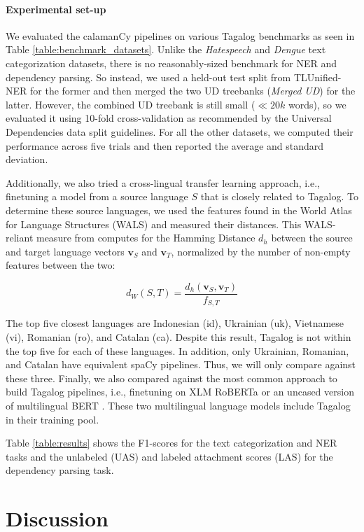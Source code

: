 \documentclass[11pt]{article}
\begin{document}
\paragraph*{Experimental set-up} 
We evaluated the calamanCy pipelines on various Tagalog benchmarks as seen in Table \ref{table:benchmark_datasets}.
Unlike the \textit{Hatespeech} and \textit{Dengue} text categorization datasets, there is no reasonably-sized benchmark for NER and dependency parsing.
So instead, we used a held-out test split from TLUnified-NER for the former and then merged the two UD treebanks (\textit{Merged UD}) for the latter. 
However, the combined UD treebank is still small ($\ll 20k$ words), so we evaluated it using 10-fold cross-validation as recommended by the Universal Dependencies data split guidelines.
For all the other datasets, we computed their performance across five trials and then reported the average and standard deviation.

Additionally, we also tried a cross-lingual transfer learning approach, i.e., finetuning a model from a source language $S$ that is closely related to Tagalog.
To determine these source languages, we used the features found in the World Atlas for Language Structures (WALS) \citep{Haspelmath2005WALS} and measured their distances.
This WALS-reliant measure from \citet{Agic2017CrossLingualPS} computes for the Hamming Distance $d_h$ between the source and target language vectors $\mathbf{v}_S$ and $\mathbf{v}_T$, normalized by the number of non-empty features between the two:

$$
d_W(S,T) = \dfrac{d_h(\mathbf{v}_S,\mathbf{v}_T)}{f_{S,T}}
$$

The top five closest languages are Indonesian (id), Ukrainian (uk), Vietnamese (vi), Romanian (ro), and Catalan (ca).
Despite this result, Tagalog is not within the top five for each of these languages.
In addition, only Ukrainian, Romanian, and Catalan have equivalent spaCy pipelines.
Thus, we will only compare against these three.
Finally, we also compared against the most common approach to build Tagalog pipelines, i.e., finetuning on XLM RoBERTa \citep{Conneau2019UnsupervisedCR} or an uncased version of multilingual BERT \citep{Devlin2019BERTPO}.
These two multilingual language models include Tagalog in their training pool.


Table \ref{table:results} shows the F1-scores for the text categorization and NER tasks and the unlabeled (UAS) and labeled attachment scores (LAS) for the dependency parsing task.

\section{Discussion}
\end{document}
